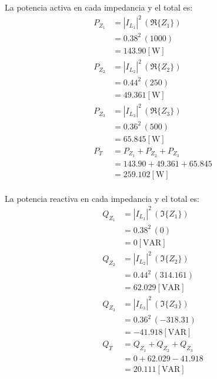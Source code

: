 \documentclass[letter,11pt]{article}
\begin{document}
La potencia activa en cada impedancia y el total es:
\begin{equation*}
    \begin{split}
        P_{Z_1} &= |I_{L_1}|^2\,(\Re\{Z_1\})\\
                &= 0.38^2\,(1000)\\
                &= 143.90[\text{W}]\\
        P_{Z_2} &= |I_{L_2}|^2\,(\Re\{Z_2\})\\
                &= 0.44^2\,(250)\\
                &= 49.361[\text{W}]\\
        P_{Z_3} &= |I_{L_3}|^2\,(\Re\{Z_3\})\\
                &= 0.36^2\,(500)\\
                &= 65.845[\text{W}]\\
        P_T &= P_{Z_1} + P_{Z_2} + P_{Z_3}\\
            &= 143.90 + 49.361 + 65.845\\
            &= 259.102[\text{W}]\\
    \end{split}
\end{equation*}

La potencia reactiva en cada impedancia y el total es:
\begin{equation*}
    \begin{split}
        Q_{Z_1} &= |I_{L_1}|^2\,(\Im\{Z_1\})\\
                &= 0.38^2\,(0)\\
                &= 0[\text{VAR}]\\
        Q_{Z_2} &= |I_{L_2}|^2\,(\Im\{Z_2\})\\
                &= 0.44^2\,(314.161)\\
                &= 62.029[\text{VAR}]\\
        Q_{Z_3} &= |I_{L_3}|^2\,(\Im\{Z_3\})\\
                &= 0.36^2\,(-318.31)\\
                &= -41.918[\text{VAR}]\\
        Q_T &= Q_{Z_1} + Q_{Z_2} + Q_{Z_3}\\
            &= 0 + 62.029 - 41.918\\
            &= 20.111[\text{VAR}]\\
    \end{split}
\end{equation*}
\end{document}
